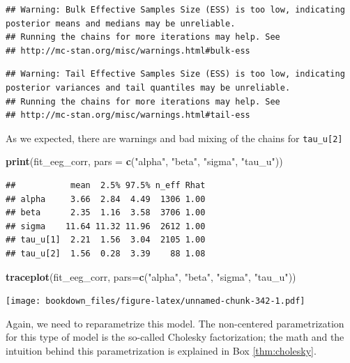 \documentclass[12pt,]{krantz}
\newenvironment{Shaded}{\begin{snugshade}}{\end{snugshade}}
\newcommand{\DataTypeTok}[1]{\textcolor[rgb]{0.13,0.29,0.53}{#1}}
\newcommand{\KeywordTok}[1]{\textcolor[rgb]{0.13,0.29,0.53}{\textbf{#1}}}
\newcommand{\NormalTok}[1]{#1}
\newcommand{\StringTok}[1]{\textcolor[rgb]{0.31,0.60,0.02}{#1}}
\theoremstyle{definition}
\theoremstyle{definition}
\theoremstyle{definition}
\theoremstyle{remark}
\begin{document}
\begin{verbatim}
## Warning: Bulk Effective Samples Size (ESS) is too low, indicating posterior means and medians may be unreliable.
## Running the chains for more iterations may help. See
## http://mc-stan.org/misc/warnings.html#bulk-ess
\end{verbatim}

\begin{verbatim}
## Warning: Tail Effective Samples Size (ESS) is too low, indicating posterior variances and tail quantiles may be unreliable.
## Running the chains for more iterations may help. See
## http://mc-stan.org/misc/warnings.html#tail-ess
\end{verbatim}

As we expected, there are warnings and bad mixing of the chains for \texttt{tau\_u{[}2{]}}

\begin{Shaded}
\begin{Highlighting}[]
\KeywordTok{print}\NormalTok{(fit_eeg_corr, }\DataTypeTok{pars =} \KeywordTok{c}\NormalTok{(}\StringTok{"alpha"}\NormalTok{, }\StringTok{"beta"}\NormalTok{, }\StringTok{"sigma"}\NormalTok{, }\StringTok{"tau_u"}\NormalTok{))}
\end{Highlighting}
\end{Shaded}

\begin{verbatim}
##           mean  2.5% 97.5% n_eff Rhat
## alpha     3.66  2.84  4.49  1306 1.00
## beta      2.35  1.16  3.58  3706 1.00
## sigma    11.64 11.32 11.96  2612 1.00
## tau_u[1]  2.21  1.56  3.04  2105 1.00
## tau_u[2]  1.56  0.28  3.39    88 1.08
\end{verbatim}

\begin{Shaded}
\begin{Highlighting}[]
\KeywordTok{traceplot}\NormalTok{(fit_eeg_corr, }\DataTypeTok{pars=}\KeywordTok{c}\NormalTok{(}\StringTok{"alpha"}\NormalTok{, }\StringTok{"beta"}\NormalTok{, }\StringTok{"sigma"}\NormalTok{, }\StringTok{"tau_u"}\NormalTok{))}
\end{Highlighting}
\end{Shaded}

\texttt{[image: bookdown\_files/figure-latex/unnamed-chunk-342-1.pdf]}

Again, we need to reparametrize this model. The non-centered parametrization for this type of model is the so-called Cholesky factorization; the math and the intuition behind this parametrization is explained in Box \ref{thm:cholesky}.
\end{document}
